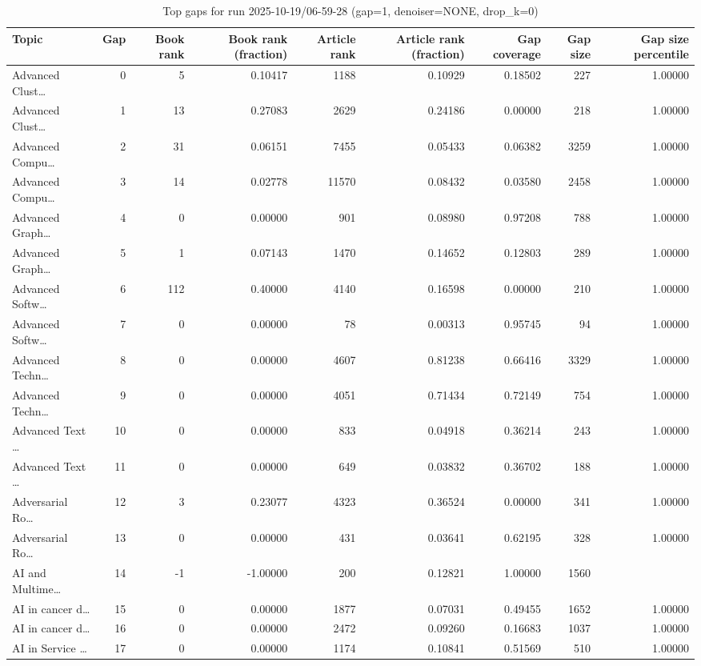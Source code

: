 \begin{table}
\caption{Top gaps for run 2025-10-19/06-59-28 (gap=1, denoiser=NONE, drop\_k=0)}
\label{tab:best_run_gap1_2025_10_19_06_59_28}
\begin{tabular}{lrrrrrrrr}
\toprule
Topic & Gap & Book rank & Book rank (fraction) & Article rank & Article rank (fraction) & Gap coverage & Gap size & Gap size percentile \\
\midrule
Advanced Clust… & 0 & 5 & 0.10417 & 1188 & 0.10929 & 0.18502 & 227 & 1.00000 \\
Advanced Clust… & 1 & 13 & 0.27083 & 2629 & 0.24186 & 0.00000 & 218 & 1.00000 \\
Advanced Compu… & 2 & 31 & 0.06151 & 7455 & 0.05433 & 0.06382 & 3259 & 1.00000 \\
Advanced Compu… & 3 & 14 & 0.02778 & 11570 & 0.08432 & 0.03580 & 2458 & 1.00000 \\
Advanced Graph… & 4 & 0 & 0.00000 & 901 & 0.08980 & 0.97208 & 788 & 1.00000 \\
Advanced Graph… & 5 & 1 & 0.07143 & 1470 & 0.14652 & 0.12803 & 289 & 1.00000 \\
Advanced Softw… & 6 & 112 & 0.40000 & 4140 & 0.16598 & 0.00000 & 210 & 1.00000 \\
Advanced Softw… & 7 & 0 & 0.00000 & 78 & 0.00313 & 0.95745 & 94 & 1.00000 \\
Advanced Techn… & 8 & 0 & 0.00000 & 4607 & 0.81238 & 0.66416 & 3329 & 1.00000 \\
Advanced Techn… & 9 & 0 & 0.00000 & 4051 & 0.71434 & 0.72149 & 754 & 1.00000 \\
Advanced Text … & 10 & 0 & 0.00000 & 833 & 0.04918 & 0.36214 & 243 & 1.00000 \\
Advanced Text … & 11 & 0 & 0.00000 & 649 & 0.03832 & 0.36702 & 188 & 1.00000 \\
Adversarial Ro… & 12 & 3 & 0.23077 & 4323 & 0.36524 & 0.00000 & 341 & 1.00000 \\
Adversarial Ro… & 13 & 0 & 0.00000 & 431 & 0.03641 & 0.62195 & 328 & 1.00000 \\
AI and Multime… & 14 & -1 & -1.00000 & 200 & 0.12821 & 1.00000 & 1560 &  \\
AI in cancer d… & 15 & 0 & 0.00000 & 1877 & 0.07031 & 0.49455 & 1652 & 1.00000 \\
AI in cancer d… & 16 & 0 & 0.00000 & 2472 & 0.09260 & 0.16683 & 1037 & 1.00000 \\
AI in Service … & 17 & 0 & 0.00000 & 1174 & 0.10841 & 0.51569 & 510 & 1.00000 \\

\end{tabular}
\end{table}
